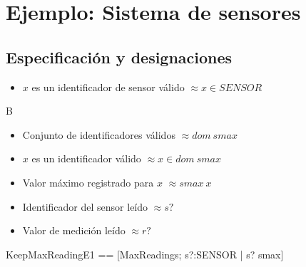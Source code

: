 \section*{Ejemplo: Sistema de sensores}

\subsection*{Especificación y designaciones}

\begin{itemize}
  \item $x$ es un identificador de sensor válido $\approx x \in SENSOR$
\end{itemize}B

\begin{zed}
[SENSOR]
\end{zed}

\begin{itemize}
  \item Conjunto de identificadores válidos $\approx dom~smax$ \\
  \item $x$ es un identificador válido $\approx x \in dom~smax$ \\
  \item Valor máximo registrado para $x$ $\approx smax~x$ 
\end{itemize}


\begin{itemize}
  \item Identificador del sensor leído $\approx s?$ \\
  \item Valor de medición leído $\approx r?$ 
\end{itemize}


\begin{zed}
KeepMaxReadingE1 == [\Xi MaxReadings; s?:SENSOR | s? \notin \dom smax]
\end{zed}

